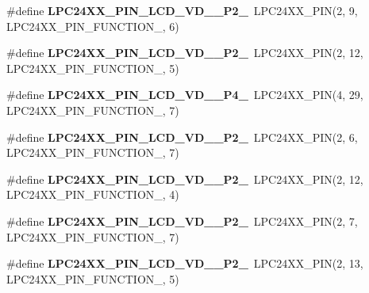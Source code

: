 \begin{DoxyCompactItemize}
\mbox{\label{group__lpc24xx__io_ga84e09dc32718fb489f727fad3f4d4f80}} 
\#define {\bfseries L\+P\+C24\+X\+X\+\_\+\+P\+I\+N\+\_\+\+L\+C\+D\+\_\+\+V\+D\+\_\+\_\+\+P2\+\_}~L\+P\+C24\+X\+X\+\_\+\+P\+IN(2, 9, L\+P\+C24\+X\+X\+\_\+\+P\+I\+N\+\_\+\+F\+U\+N\+C\+T\+I\+O\+N\+\_, 6)
\item 
\mbox{\label{group__lpc24xx__io_gabf1069b0f36e6f203e28834c600cd0f5}} 
\#define {\bfseries L\+P\+C24\+X\+X\+\_\+\+P\+I\+N\+\_\+\+L\+C\+D\+\_\+\+V\+D\+\_\+\_\+\+P2\+\_}~L\+P\+C24\+X\+X\+\_\+\+P\+IN(2, 12, L\+P\+C24\+X\+X\+\_\+\+P\+I\+N\+\_\+\+F\+U\+N\+C\+T\+I\+O\+N\+\_, 5)
\item 
\mbox{\label{group__lpc24xx__io_gae90e3984f2a7637cdb9529a7b38015a7}} 
\#define {\bfseries L\+P\+C24\+X\+X\+\_\+\+P\+I\+N\+\_\+\+L\+C\+D\+\_\+\+V\+D\+\_\+\_\+\+P4\+\_}~L\+P\+C24\+X\+X\+\_\+\+P\+IN(4, 29, L\+P\+C24\+X\+X\+\_\+\+P\+I\+N\+\_\+\+F\+U\+N\+C\+T\+I\+O\+N\+\_, 7)
\item 
\mbox{\label{group__lpc24xx__io_ga1e95112631c72f01799c7a057187a01e}} 
\#define {\bfseries L\+P\+C24\+X\+X\+\_\+\+P\+I\+N\+\_\+\+L\+C\+D\+\_\+\+V\+D\+\_\+\_\+\+P2\+\_}~L\+P\+C24\+X\+X\+\_\+\+P\+IN(2, 6, L\+P\+C24\+X\+X\+\_\+\+P\+I\+N\+\_\+\+F\+U\+N\+C\+T\+I\+O\+N\+\_, 7)
\item 
\mbox{\label{group__lpc24xx__io_ga5dfed67243052c74813b74326a66022f}} 
\#define {\bfseries L\+P\+C24\+X\+X\+\_\+\+P\+I\+N\+\_\+\+L\+C\+D\+\_\+\+V\+D\+\_\+\_\+\+P2\+\_}~L\+P\+C24\+X\+X\+\_\+\+P\+IN(2, 12, L\+P\+C24\+X\+X\+\_\+\+P\+I\+N\+\_\+\+F\+U\+N\+C\+T\+I\+O\+N\+\_, 4)
\item 
\mbox{\label{group__lpc24xx__io_gad1903f60e8e293fd0c6622c91759557b}} 
\#define {\bfseries L\+P\+C24\+X\+X\+\_\+\+P\+I\+N\+\_\+\+L\+C\+D\+\_\+\+V\+D\+\_\+\_\+\+P2\+\_}~L\+P\+C24\+X\+X\+\_\+\+P\+IN(2, 7, L\+P\+C24\+X\+X\+\_\+\+P\+I\+N\+\_\+\+F\+U\+N\+C\+T\+I\+O\+N\+\_, 7)
\item 
\mbox{\label{group__lpc24xx__io_ga4473f9c8bf716184eea390ca6c86178a}} 
\#define {\bfseries L\+P\+C24\+X\+X\+\_\+\+P\+I\+N\+\_\+\+L\+C\+D\+\_\+\+V\+D\+\_\+\_\+\+P2\+\_}~L\+P\+C24\+X\+X\+\_\+\+P\+IN(2, 13, L\+P\+C24\+X\+X\+\_\+\+P\+I\+N\+\_\+\+F\+U\+N\+C\+T\+I\+O\+N\+\_, 5)

\end{DoxyCompactItemize}

